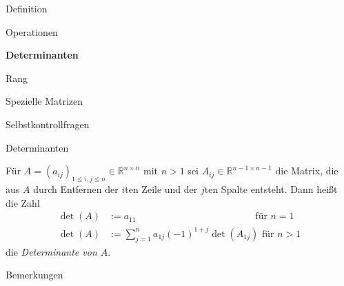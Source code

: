 \documentclass[
  8pt,
  ignorenonframetext,
]{beamer}
\begin{document}
\begin{frame}{}
\protect\hypertarget{section-5}{}
\large
{}
\vfill

Definition

Operationen

\textbf{Determinanten}

Rang

Spezielle Matrizen

Selbstkontrollfragen \vfill
\end{frame}

\begin{frame}{Determinanten}
\protect\hypertarget{determinanten}{}
\footnotesize
\begin{definition}[Determinante]
\justifying
Für $A = (a_{ij})_{1 \le i,j \le n} \in \mathbb{R}^{n \times n}$ mit $n>1$ sei
$A_{ij} \in \mathbb{R}^{n-1 \times n-1}$ die Matrix, die aus $A$ durch
Entfernen der $i$ten Zeile und der $j$ten Spalte entsteht.
Dann heißt die Zahl
\begin{align}
\det(A) & := a_{11} \quad\quad\quad\quad\quad\quad\quad\quad\quad\quad\quad\quad   \mbox{ für } n = 1\\
\det(A) & := \sum_{j = 1}^n a_{1j}(-1)^{1+j} \det\left(A_{1j}\right)               \mbox{ für } n > 1
\end{align}
die \textit{Determinante von $A$}.
\end{definition}

\footnotesize

Bemerkungen


\end{frame}
\end{document}
